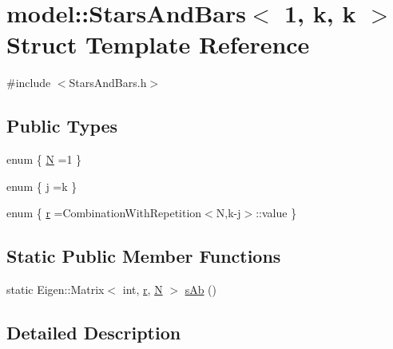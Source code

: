 \hypertarget{structmodel_1_1_stars_and_bars_3_011_00_01k_00_01k_01_4}{}\section{model\+:\+:Stars\+And\+Bars$<$ 1, k, k $>$ Struct Template Reference}
\label{structmodel_1_1_stars_and_bars_3_011_00_01k_00_01k_01_4}


{\ttfamily \#include $<$Stars\+And\+Bars.\+h$>$}

\subsection*{Public Types}
\begin{DoxyCompactItemize}
\item 
enum \{ \hyperlink{structmodel_1_1_stars_and_bars_3_011_00_01k_00_01k_01_4_a2ca2192ad0b99b7e6f12fbe7dfa337b8a906fb6b5c95b61c15307eafdb059d503}{N} =1
 \}
\item 
enum \{ \hyperlink{structmodel_1_1_stars_and_bars_3_011_00_01k_00_01k_01_4_a76f9128a32c689984f81c34817c4af84ab943384b43bb50fa4b432cb1762564e7}{j} =k
 \}
\item 
enum \{ \hyperlink{structmodel_1_1_stars_and_bars_3_011_00_01k_00_01k_01_4_a65ce8558e4e2906caee4b254d86fdba6aaaf8c52788f4e8c0551340d89ec1f1eb}{r} =Combination\+With\+Repetition$<$N,k-\/j$>$\+:\+:value
 \}
\end{DoxyCompactItemize}
\subsection*{Static Public Member Functions}
\begin{DoxyCompactItemize}
\item 
static Eigen\+::\+Matrix$<$ int, \hyperlink{structmodel_1_1_stars_and_bars_3_011_00_01k_00_01k_01_4_a65ce8558e4e2906caee4b254d86fdba6aaaf8c52788f4e8c0551340d89ec1f1eb}{r}, \hyperlink{structmodel_1_1_stars_and_bars_3_011_00_01k_00_01k_01_4_a2ca2192ad0b99b7e6f12fbe7dfa337b8a906fb6b5c95b61c15307eafdb059d503}{N} $>$ \hyperlink{structmodel_1_1_stars_and_bars_3_011_00_01k_00_01k_01_4_af35294905e0666c8c09520bb83299dfe}{s\+Ab} ()
\end{DoxyCompactItemize}


\subsection{Detailed Description}
